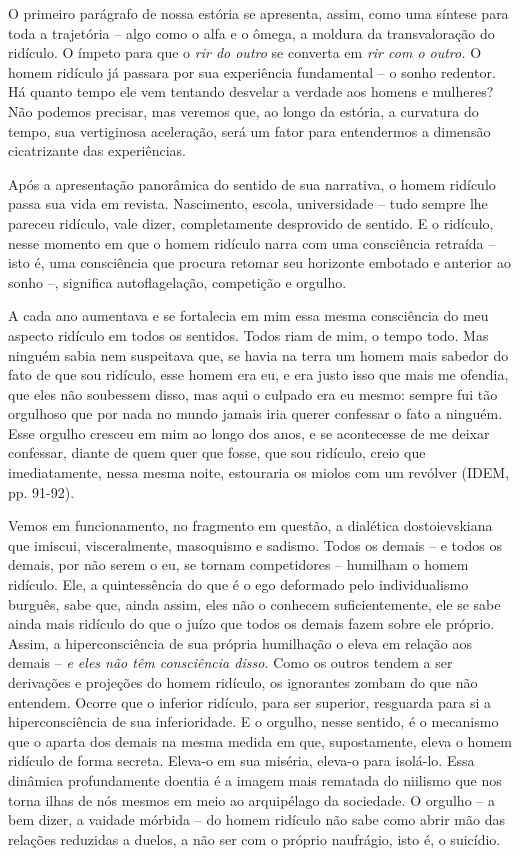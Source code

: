 O primeiro parágrafo de nossa estória se apresenta, assim, como uma
síntese para toda a trajetória -- algo como o alfa e o ômega, a moldura
da transvaloração do ridículo. O ímpeto para que o \emph{rir do outro}
se converta em \emph{rir com o outro.} O homem ridículo já passara por
sua experiência fundamental -- o sonho redentor. Há quanto tempo ele vem
tentando desvelar a verdade aos homens e mulheres? Não podemos precisar,
mas veremos que, ao longo da estória, a curvatura do tempo, sua
vertiginosa aceleração, será um fator para entendermos a dimensão
cicatrizante das experiências.

Após a apresentação panorâmica do sentido de sua narrativa, o homem
ridículo passa sua vida em revista. Nascimento, escola, universidade --
tudo sempre lhe pareceu ridículo, vale dizer, completamente desprovido
de sentido. E o ridículo, nesse momento em que o homem ridículo narra
com uma consciência retraída -- isto é, uma consciência que procura
retomar seu horizonte embotado e anterior ao sonho --, significa
autoflagelação, competição e orgulho.

A cada ano aumentava e se fortalecia em mim essa mesma consciência do
meu aspecto ridículo em todos os sentidos. Todos riam de mim, o tempo
todo. Mas ninguém sabia nem suspeitava que, se havia na terra um homem
mais sabedor do fato de que sou ridículo, esse homem era eu, e era justo
isso que mais me ofendia, que eles não soubessem disso, mas aqui o
culpado era eu mesmo: sempre fui tão orgulhoso que por nada no mundo
jamais iria querer confessar o fato a ninguém. Esse orgulho cresceu em
mim ao longo dos anos, e se acontecesse de me deixar confessar, diante
de quem quer que fosse, que sou ridículo, creio que imediatamente, nessa
mesma noite, estouraria os miolos com um revólver (IDEM, pp. 91-92).

Vemos em funcionamento, no fragmento em questão, a dialética
dostoievskiana que imiscui, visceralmente, masoquismo e sadismo. Todos
os demais -- e todos os demais, por não serem o eu, se tornam
competidores -- humilham o homem ridículo. Ele, a quintessência do que é
o ego deformado pelo individualismo burguês, sabe que, ainda assim, eles
não o conhecem suficientemente, ele se sabe ainda mais ridículo do que o
juízo que todos os demais fazem sobre ele próprio. Assim, a
hiperconsciência de sua própria humilhação o eleva em relação aos demais
-- \emph{e eles não têm consciência disso.} Como os outros tendem a ser
derivações e projeções do homem ridículo, os ignorantes zombam do que
não entendem. Ocorre que o inferior ridículo, para ser superior,
resguarda para si a hiperconsciência de sua inferioridade. E o orgulho,
nesse sentido, é o mecanismo que o aparta dos demais na mesma medida em
que, supostamente, eleva o homem ridículo de forma secreta. Eleva-o em
sua miséria, eleva-o para isolá-lo. Essa dinâmica profundamente doentia
é a imagem mais rematada do niilismo que nos torna ilhas de nós mesmos
em meio ao arquipélago da sociedade. O orgulho -- a bem dizer, a vaidade
mórbida -- do homem ridículo não sabe como abrir mão das relações
reduzidas a duelos, a não ser com o próprio naufrágio, isto é, o
suicídio.

